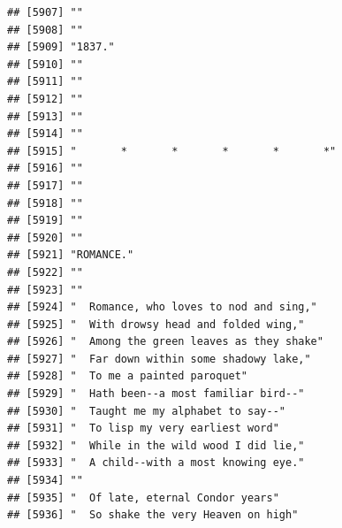 \documentclass{article}\usepackage[]{graphicx}\usepackage[]{color}
\makeatletter
\newenvironment{kframe}{%
 \def\at@end@of@kframe{}%
 \ifinner\ifhmode%
  \def\at@end@of@kframe{\end{minipage}}%
  \begin{minipage}{\columnwidth}%
 \fi\fi%
 \def\FrameCommand##1{\hskip\@totalleftmargin \hskip-\fboxsep
 \colorbox{shadecolor}{##1}\hskip-\fboxsep
     \hskip-\linewidth \hskip-\@totalleftmargin \hskip\columnwidth}%
 \MakeFramed {\advance\hsize-\width
   \@totalleftmargin\z@ \linewidth\hsize
   \@setminipage}}%
 {\par\unskip\endMakeFramed%
 \at@end@of@kframe}
\newenvironment{knitrout}{}{} %
\makeatother
\begin{document}
\begin{knitrout}
\begin{kframe}
\begin{verbatim}
## [5907] ""                                                                            
## [5908] ""                                                                            
## [5909] "1837."                                                                       
## [5910] ""                                                                            
## [5911] ""                                                                            
## [5912] ""                                                                            
## [5913] ""                                                                            
## [5914] ""                                                                            
## [5915] "       *       *       *       *       *"                                    
## [5916] ""                                                                            
## [5917] ""                                                                            
## [5918] ""                                                                            
## [5919] ""                                                                            
## [5920] ""                                                                            
## [5921] "ROMANCE."                                                                    
## [5922] ""                                                                            
## [5923] ""                                                                            
## [5924] "  Romance, who loves to nod and sing,"                                       
## [5925] "  With drowsy head and folded wing,"                                         
## [5926] "  Among the green leaves as they shake"                                      
## [5927] "  Far down within some shadowy lake,"                                        
## [5928] "  To me a painted paroquet"                                                  
## [5929] "  Hath been--a most familiar bird--"                                         
## [5930] "  Taught me my alphabet to say--"                                            
## [5931] "  To lisp my very earliest word"                                             
## [5932] "  While in the wild wood I did lie,"                                         
## [5933] "  A child--with a most knowing eye."                                         
## [5934] ""                                                                            
## [5935] "  Of late, eternal Condor years"                                             
## [5936] "  So shake the very Heaven on high"                                          

\end{verbatim}
\end{kframe}
\end{knitrout}
\end{document}
